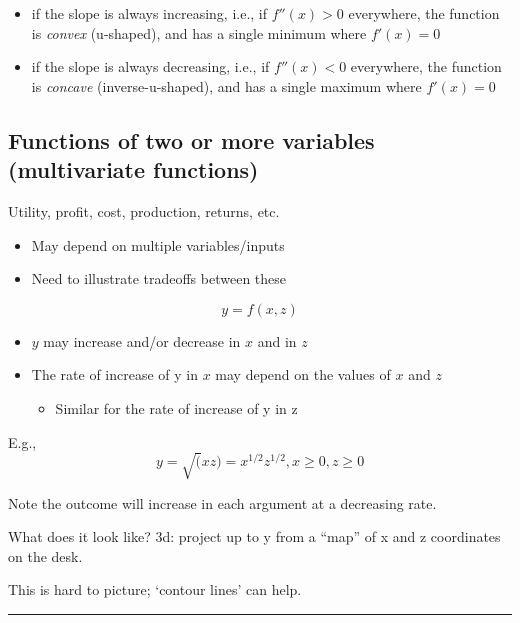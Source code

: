 \documentclass[]{article}
\providecommand{\tightlist}{%
  \setlength{\itemsep}{0pt}\setlength{\parskip}{0pt}}
\begin{document}
\begin{itemize}
\tightlist
\item
  if the slope is always increasing, i.e., if \(f''(x)>0\) everywhere, the function is \emph{convex} (u-shaped), and has a single minimum where \(f'(x)=0\)
\item
  if the slope is always decreasing, i.e., if \(f''(x)<0\) everywhere, the function is \emph{concave} (inverse-u-shaped), and has a single maximum where \(f'(x)=0\)
\end{itemize}

\hypertarget{multivar-functions}{%
\subsection{Functions of two or more variables (multivariate functions)}\label{multivar-functions}}

Utility, profit, cost, production, returns, etc.

\begin{itemize}
\tightlist
\item
  May depend on multiple variables/inputs
\item
  Need to illustrate tradeoffs between these
\end{itemize}

\[y=f(x,z)\]

\begin{itemize}
\item
  \(y\) may increase and/or decrease in \(x\) and in \(z\)
\item
  The rate of increase of y in \(x\) may depend on the values of \(x\) and \(z\)

  \begin{itemize}
  \tightlist
  \item
    Similar for the rate of increase of y in z
  \end{itemize}
\end{itemize}

\bigskip

E.g., \[y=\sqrt(xz) = x^{1/2}z^{1/2}, x \geq 0, z \geq 0\]

Note the outcome will increase in each argument at a decreasing rate.

What does it look like? 3d: project up to y from a ``map'' of x and z coordinates on the desk.

This is hard to picture; `contour lines' can help.

\begin{center}\rule{0.5\linewidth}{\linethickness}\end{center}
\end{document}
